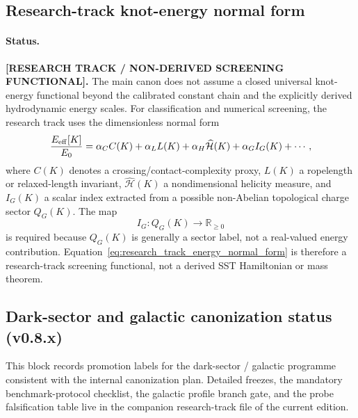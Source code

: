 \documentclass[11pt]{article}
\theoremstyle{definition}
\theoremstyle{plain}
\theoremstyle{remark}
\begin{document}
    \subsection{Research-track knot-energy normal form}
        \label{sec:research_track_knot_energy_normal_form}

        \paragraph{Status.}
        \textbf{[RESEARCH TRACK / NON-DERIVED SCREENING FUNCTIONAL].}
        The main canon does not assume a closed universal knot-energy functional beyond the calibrated constant chain and the explicitly derived hydrodynamic energy scales.  For classification and numerical screening, the research track uses the dimensionless normal form
        \begin{equation}
            \frac{E_{\rm eff}[K]}{E_0}
            =
            \alpha_C C(K)
            +\alpha_L L(K)
            +\alpha_H\widehat{\mathcal H}(K)
            +\alpha_G I_G(K)
            +\cdots,
            \label{eq:research_track_energy_normal_form}
        \end{equation}
        where $C(K)$ denotes a crossing/contact-complexity proxy, $L(K)$ a ropelength or relaxed-length invariant, $\widehat{\mathcal H}(K)$ a nondimensional helicity measure, and $I_G(K)$ a scalar index extracted from a possible non-Abelian topological charge sector $Q_G(K)$.  The map
        \begin{equation}
            I_G:Q_G(K)\longrightarrow \mathbb R_{\ge 0}
        \end{equation}
        is required because $Q_G(K)$ is generally a sector label, not a real-valued energy contribution.  Equation~\eqref{eq:research_track_energy_normal_form} is therefore a research-track screening functional, not a derived SST Hamiltonian or mass theorem.

    \subsection{Dark-sector and galactic canonization status (v0.8.x)}
        \label{sec:dark-canonicalization-status}

        This block records promotion labels for the dark-sector / galactic programme consistent with the internal canonization plan.  Detailed freezes, the mandatory benchmark-protocol checklist, the galactic profile branch gate, and the probe falsification table live in the companion research-track file of the current edition.
\end{document}
